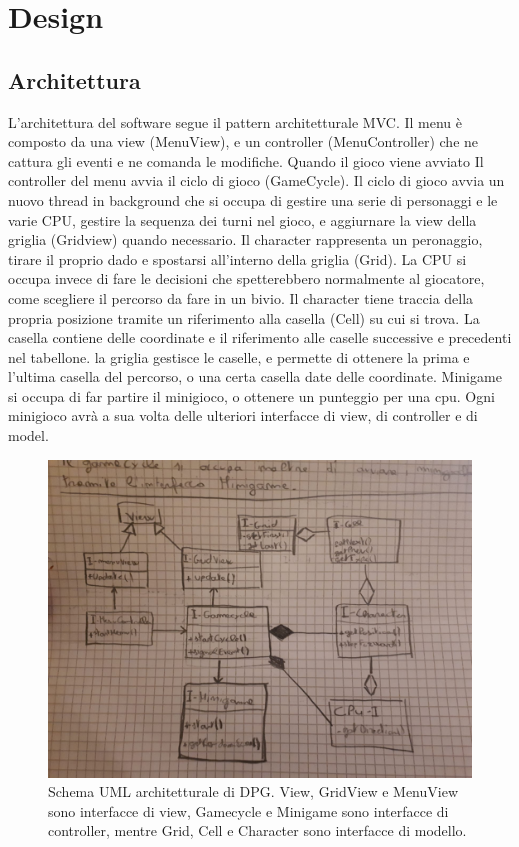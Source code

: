 \documentclass[a4paper,12pt]{report}
\begin{document}
\chapter{Design}

\section{Architettura}

L'architettura del software segue il pattern architetturale MVC.
%
Il menu è composto da una view (MenuView), e un controller (MenuController) che ne cattura gli eventi e ne comanda le modifiche.
%
Quando il gioco viene avviato Il controller del menu avvia il ciclo di gioco (GameCycle).
%
Il ciclo di gioco avvia un nuovo thread in background che si occupa di gestire una serie di personaggi e le varie CPU, gestire la sequenza dei turni nel gioco, e aggiurnare la view della griglia (Gridview) quando necessario.
%
Il character rappresenta un peronaggio, tirare il proprio dado e spostarsi all'interno della griglia (Grid).
%
La CPU si occupa invece di fare le decisioni che spetterebbero normalmente al giocatore, come scegliere il percorso da fare in un bivio.
%
Il character tiene traccia della propria posizione tramite un riferimento alla casella (Cell) su cui si trova.
%
La casella contiene delle coordinate e il riferimento alle caselle successive e precedenti nel tabellone.
%
la griglia gestisce le caselle, e permette di ottenere la prima e l'ultima casella del percorso, o una certa casella date delle coordinate.
%
Minigame si occupa di far partire il minigioco, o ottenere un punteggio per una cpu.
%
Ogni minigioco avrà a sua volta delle ulteriori interfacce di view, di controller e di model.

\begin{figure}[!t]
\centering{}
\includegraphics[width=\textwidth]{images/arch.jpeg}
\caption{Schema UML architetturale di DPG. View, GridView e MenuView sono interfacce di view, Gamecycle e Minigame sono interfacce di controller, mentre Grid, Cell e Character sono interfacce di modello.}
\label{img:goodarch}
\end{figure}
\end{document}
